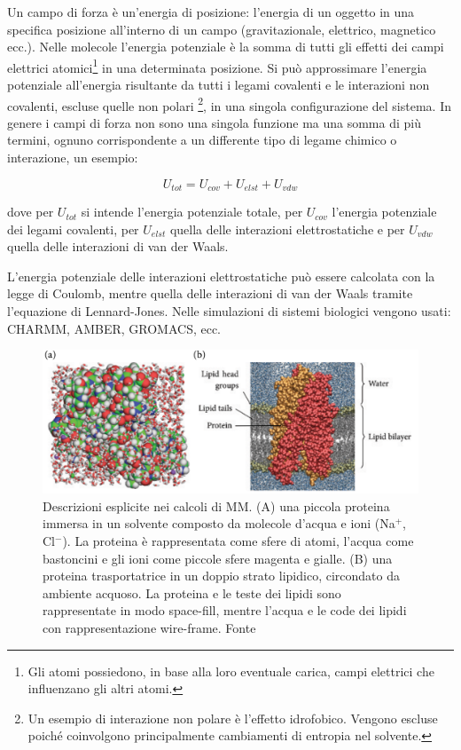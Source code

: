{{\par Un campo di forza è un'energia di posizione: l'energia di un oggetto in una specifica posizione all'interno di un campo (gravitazionale, elettrico, magnetico ecc.). Nelle molecole l'energia potenziale è la somma di tutti gli effetti dei campi elettrici atomici\footnote{Gli atomi possiedono, in base alla loro eventuale carica, campi elettrici che influenzano gli altri atomi.} in una determinata posizione. Si può approssimare l'energia potenziale all'energia risultante da tutti i legami covalenti e le interazioni non covalenti, escluse quelle non polari \footnote{Un esempio di interazione non polare è l'effetto idrofobico. Vengono escluse poiché coinvolgono principalmente cambiamenti di entropia nel solvente.}, in una singola configurazione del sistema. In genere i campi di forza non sono una singola funzione ma una somma di più termini, ognuno corrispondente a un differente tipo di legame chimico o interazione, un esempio:

\[ U_{tot}=U_{cov}+U_{elst}+U_{vdw} \]

dove per $U_{tot}$ si intende l'energia potenziale totale, per $U_{cov}$ l'energia potenziale dei legami covalenti, per $U_{elst}$ quella delle interazioni elettrostatiche e per $U_{vdw}$ quella delle interazioni di van der Waals.

\par L'energia potenziale delle interazioni elettrostatiche può essere calcolata con la legge di Coulomb, mentre quella delle interazioni di van der Waals tramite l'equazione di Lennard-Jones. Nelle simulazioni di sistemi biologici vengono usati: CHARMM, AMBER, GROMACS, ecc.

\begin{figure}[!htb]
	\centering
	\includegraphics[scale=0.4]{images/esplicita-mm.png}
	\caption{Descrizioni esplicite nei calcoli di MM. (A) una piccola proteina immersa in un solvente composto da molecole d'acqua e ioni (Na$^{+}$, Cl$^{-}$). La proteina è rappresentata come sfere di atomi, l'acqua come bastoncini e gli ioni come piccole sfere magenta e gialle. (B) una proteina trasportatrice in un doppio strato lipidico, circondato da ambiente acquoso. La proteina e le teste dei lipidi sono rappresentate in modo space-fill, mentre l'acqua e le code dei lipidi con rappresentazione wire-frame. Fonte \cite{kessel_ben-tal_2018}}
	\label{fig:descrizione-esplicita-mm}
\end{figure}

}}
